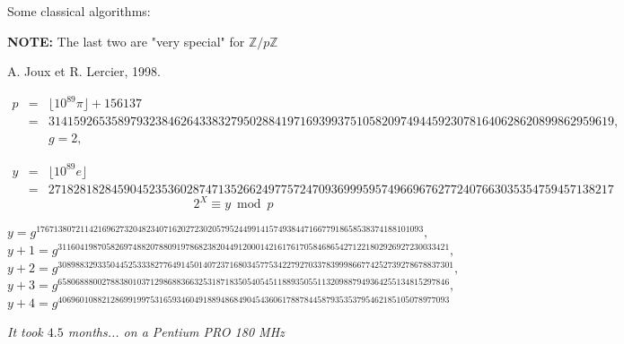 \documentclass[landscape,display]{powersem}%
\newcommand{\heading}[1]{%
 \begin{center}
  \large\bf
  \shadowbox{{\textcolor{conceptcolor}{#1}}}%
 \end{center}
 \vspace{1ex minus 1ex}}
\newcommand{\Z}{{\mathbb Z}}
\begin{document}
\begin{slide}
\heading{Discrete Logarithms Computation}\pause

Some classical algorithms:\pause

\pause\bigskip


\textbf{NOTE:} The last two are "very special" for $\Z/p\Z$
\end{slide}


\begin{slide}


\heading{Discrete Logarithms computation Records 1/2}


A. Joux et R. Lercier, 1998.\pause

\begin{tiny}
$\begin{array}{rcl}  p &=& \lfloor 10^{89} \pi \rfloor+ 156137\\
   &=& 314159265358979323846264338327950288419716939937510582097494459230781640628620899862959619,\\
   & &g = 2,  \end{array}$\pause

$\begin{array}{rcl}  y &=& \lfloor 10^{89} e \rfloor\\
   &=& 271828182845904523536028747135266249775724709369995957496696762772407663035354759457138217
   \end{array}$\pause
$$2^X\equiv y\bmod p$$\pause

$  y =
g^{1767138072114216962732048234071620272302057952449914157493844716677918658538374188101093},$\pause
$  y+1 =
g^{31160419870582697488207880919786823820449120001421617617058468654271221802926927230033421},$\pause
$  y+2 =
g^{308988329335044525333827764914501407237168034577534227927033783999866774252739278678837301},$\pause
$  y+3 =
g^{65806888002788380103712986883663253187183505405451188935055113209887949364255134815297846},$\pause
$  y+4 =
g^{40696010882128699199753165934604918894868490454360617887844587935353795462185105078977093}$\pause
\end{tiny}\medskip

\centerline{\emph{It took $4.5$ months... on a Pentium PRO 180 MHz }}
\end{slide}
\end{document}
